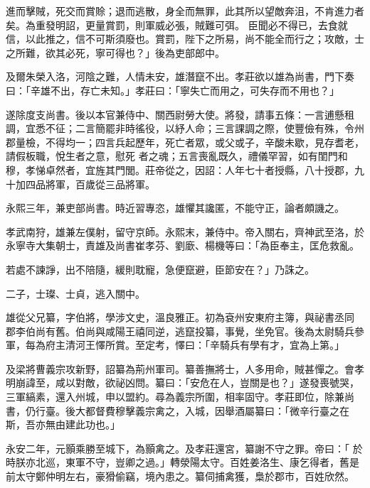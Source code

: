 \begin{pinyinscope}
 進而擊賊，死交而賞賒；退而逃散，身全而無罪，此其所以望敵奔沮，不肯進力者矣。為重發明詔，更量賞罰，則軍威必張，賊難可弭。
 臣聞必不得已，去食就信，以此推之，信不可斯須廢也。賞罰，陛下之所易，尚不能全而行之；攻敵，士之所難，欲其必死，寧可得也？」後為吏部郎中。



 及爾朱榮入洛，河陰之難，人情未安，雄潛竄不出。孝莊欲以雄為尚書，門下奏曰：「辛雄不出，存亡未知。」孝莊曰：「寧失亡而用之，可失存而不用也？」



 遂除度支尚書。後以本官兼侍中、關西尉勞大使。將發，請事五條：一言逋懸租調，宜悉不征；二言簡罷非時徭役，以紓人命；三言課調之際，使豐儉有殊，令州郡量檢，不得均一；四言兵起歷年，死亡者眾，或父或子，辛酸未歇，見存耆老，請假板職，悅生者之意，慰死
 者之魂；五言喪亂既久，禮儀罕習，如有閨門和穆，孝悌卓然者，宜旌其門閭。莊帝從之，因詔：人年七十者授縣，八十授郡，九十加四品將軍，百歲從三品將軍。



 永熙三年，兼吏部尚書。時近習專恣，雄懼其讒匿，不能守正，論者頗譏之。



 孝武南狩，雄兼左僕射，留守京師。永熙末，兼侍中。帝入關右，齊神武至洛，於永寧寺大集朝士，責雄及尚書崔孝芬、劉廞、楊機等曰：「為臣奉主，匡危救亂。



 若處不諫諍，出不陪隨，緩則耽寵，急便竄避，臣節安在？」乃誅之。



 二子，士璨、士貞，逃入關中。



 雄從父兄纂，字伯將，學涉文史，溫良雅正。初為袞州安東府主簿，與祕書丞同
 郡李伯尚有舊。伯尚與咸陽王禧同逆，逃竄投纂，事覺，坐免官。後為太尉騎兵參軍，每為府主清河王懌所賞。至定考，懌曰：「辛騎兵有學有才，宜為上第。」



 及梁將曹義宗攻新野，詔纂為荊州軍司。纂善撫將士，人多用命，賊甚憚之。會孝明崩諱至，咸以對敵，欲祕凶問。纂曰：「安危在人，豈關是也？」遂發喪號哭，三軍縞素，還入州城，申以盟約。尋為義宗所圍，相率固守。孝莊即位，除兼尚書，仍行臺。後大都督費穆擊義宗禽之，入城，因舉酒屬纂曰：「微辛行臺之在斯，吾亦無由建此功也。」



 永安二年，元顥乘勝至城下，為顥禽之。及孝莊還宮，纂謝不守之罪。帝曰：「
 於時朕亦北巡，東軍不守，豈卿之過。」轉滎陽太守。百姓姜洛生、康乞得者，舊是前太守鄭仲明左右，豪猾偷竊，境內患之。纂伺捕禽獲，梟於郡市，百姓欣然。




\end{pinyinscope}
